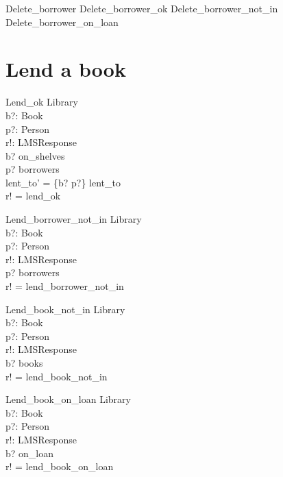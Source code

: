\documentclass[11pt, fuzz]{article}
\begin{document}
\begin{zed}
    Delete\_borrower  Delete\_borrower\_ok \lor Delete\_borrower\_not\_in \lor \\ Delete\_borrower\_on\_loan
\end{zed}


\section{Lend a book}


\begin{schema}{Lend\_ok}
    \Delta Library  \\
    b?: Book        \\
    p?: Person      \\
    r!: LMSResponse \\
\where
    b? \in on\_shelves                          \\
    p? \in borrowers                            \\
    lent\_to' = \{b? \mapsto p?\} \cup lent\_to \\
    r! = lend\_ok                               \\
\end{schema}

\begin{schema}{Lend\_borrower\_not\_in}
    \Xi Library  \\
    b?: Book        \\
    p?: Person      \\
    r!: LMSResponse \\
\where
    p? \notin borrowers          \\
    r! = lend\_borrower\_not\_in \\
\end{schema}

\begin{schema}{Lend\_book\_not\_in}
    \Xi Library  \\
    b?: Book        \\
    p?: Person      \\
    r!: LMSResponse \\
\where
    b? \notin books          \\
    r! = lend\_book\_not\_in \\
\end{schema}

\begin{schema}{Lend\_book\_on\_loan}
    \Xi Library  \\
    b?: Book        \\
    p?: Person      \\
    r!: LMSResponse \\
\where
    b? \in on\_loan          \\
    r! = lend\_book\_on\_loan \\
\end{schema}
\end{document}
